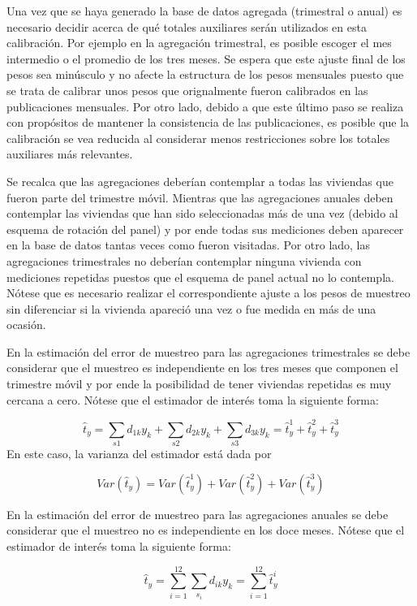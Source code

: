\documentclass[
  12pt,
  spanish,
]{book}
\begin{document}
Una vez que se haya generado la base de datos agregada (trimestral o anual) es necesario decidir acerca de qué totales auxiliares serán utilizados en esta calibración. Por ejemplo en la agregación trimestral, es posible escoger el mes intermedio o el promedio de los tres meses. Se espera que este ajuste final de los pesos sea minúsculo y no afecte la estructura de los pesos mensuales puesto que se trata de calibrar unos pesos que orignalmente fueron calibrados en las publicaciones mensuales. Por otro lado, debido a que este último paso se realiza con propósitos de mantener la consistencia de las publicaciones, es posible que la calibración se vea reducida al considerar menos restricciones sobre los totales auxiliares más relevantes.

Se recalca que las agregaciones deberían contemplar a todas las viviendas que fueron parte del trimestre móvil. Mientras que las agregaciones anuales deben contemplar las viviendas que han sido seleccionadas más de una vez (debido al esquema de rotación del panel) y por ende todas sus mediciones deben aparecer en la base de datos tantas veces como fueron visitadas. Por otro lado, las agregaciones trimestrales no deberían contemplar ninguna vivienda con mediciones repetidas puestos que el esquema de panel actual no lo contempla. Nótese que es necesario realizar el correspondiente ajuste a los pesos de muestreo sin diferenciar si la vivienda apareció una vez o fue medida en más de una ocasión.

En la estimación del error de muestreo para las agregaciones trimestrales se debe considerar que el muestreo es independiente en los tres meses que componen el trimestre móvil y por ende la posibilidad de tener viviendas repetidas es muy cercana a cero. Nótese que el estimador de interés toma la siguiente forma:

\[
\hat{t}_y 
= \sum_{s1} d_{1k} y_k + \sum_{s2} d_{2k} y_k + \sum_{s3} d_{3k} y_k
= \hat{t}_{y}^1 + \hat{t}_{y}^2 + \hat{t}_{y}^3
\]
En este caso, la varianza del estimador está dada por

\[
Var(\hat{t}_y)
= Var(\hat{t}_{y}^1) + Var(\hat{t}_{y}^2) + Var(\hat{t}_{y}^3)
\]

En la estimación del error de muestreo para las agregaciones anuales se debe considerar que el muestreo no es independiente en los doce meses. Nótese que el estimador de interés toma la siguiente forma:

\[
\hat{t}_y 
= \sum_{i=1}^{12}\sum_{s_i} d_{ik} y_k 
= \sum_{i=1}^{12} \hat{t}_{y}^i
\]
\end{document}
